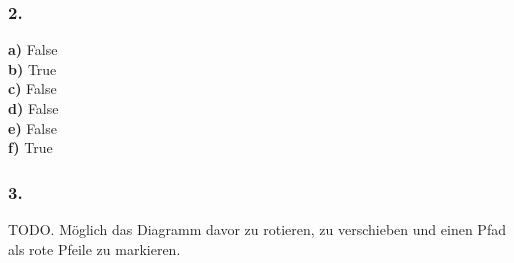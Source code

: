 \documentclass[12pt, a4paper]{article}
\begin{document}
\subsubsection*{2.}
\textbf{a)} False \\
\textbf{b)} True \\
\textbf{c)} False \\
\textbf{d)} False \\
\textbf{e)} False \\
\textbf{f)} True
\subsubsection*{3.}
TODO. Möglich das Diagramm davor zu rotieren, zu verschieben und einen Pfad als rote Pfeile zu markieren.
\end{document}
